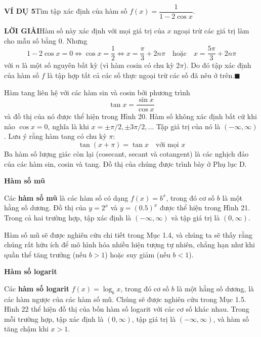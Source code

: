 \begin{minipage}[t]{0.708\textwidth}
    \fontsize{8.8pt}{11.5pt}\selectfont
    \noindent\textbf{\textsf{\color{stewartcyan}VÍ DỤ 5}}\quad Tìm tập xác định của hàm số $f(x) = \dfrac{1}{1 - 2 \cos x}$.

    \vspace{0.2em}
    \noindent\textbf{\textsf{\color{stewartcyan}LỜI GIẢI}}\quad Hàm số này xác định với mọi giá trị của $x$ ngoại trừ các giá trị làm cho mẫu số bằng $0$. Nhưng
    \[
    1 - 2 \cos x = 0 \iff \cos x = \frac{1}{2} \iff x = \frac{\pi}{3} + 2n\pi \quad \text{hoặc} \quad x = \frac{5\pi}{3} + 2n\pi
    \]
    với $n$ là một số nguyên bất kỳ (vì hàm cosin có chu kỳ $2\pi$). Do đó tập xác định của hàm số $f$ là tập hợp tất cả các số thực ngoại trừ các số đã nêu ở trên.\hfill{\color{stewartcyan}$\blacksquare$}

    \vspace{0.4em}
    Hàm tang liên hệ với các hàm sin và cosin bởi phương trình
    \[
    \tan x = \frac{\sin x}{\cos x}
    \]
    và đồ thị của nó được thể hiện trong Hình 20. Hàm số không xác định bất cứ khi nào $\cos x = 0$, nghĩa là khi $x = \pm\pi/2, \pm3\pi/2, \dots$ Tập giá trị của nó là $(-\infty, \infty)$. Lưu ý rằng hàm tang có chu kỳ $\pi$:
    \[
    \tan(x + \pi) = \tan x \quad \text{với mọi } x
    \]
    Ba hàm số lượng giác còn lại (cosecant, secant và cotangent) là các nghịch đảo của các hàm sin, cosin và tang. Đồ thị của chúng được trình bày ở Phụ lục D.

    \vspace{0.6em}
    \noindent{\color{stewartcyan}\rule{6pt}{6pt}}\;\textbf{\textsf{Hàm số mũ}}
    
    \vspace{0.2em}
    \noindent Các \textbf{hàm số mũ} là các hàm số có dạng $f(x) = b^x$, trong đó cơ số $b$ là một hằng số dương. Đồ thị của $y = 2^x$ và $y = (0.5)^x$ được thể hiện trong Hình 21. Trong cả hai trường hợp, tập xác định là $(-\infty, \infty)$ và tập giá trị là $(0, \infty)$.

    Hàm số mũ sẽ được nghiên cứu chi tiết trong Mục 1.4, và chúng ta sẽ thấy rằng chúng rất hữu ích để mô hình hóa nhiều hiện tượng tự nhiên, chẳng hạn như khi quần thể tăng trưởng (nếu $b > 1$) hoặc suy giảm (nếu $b < 1$).

    \vspace{0.6em}
    \noindent{\color{stewartcyan}\rule{6pt}{6pt}}\;\textbf{\textsf{Hàm số logarit}}
    
    \vspace{0.2em}
    \noindent Các \textbf{hàm số logarit} $f(x) = \log_b x$, trong đó cơ số $b$ là một hằng số dương, là các hàm ngược của các hàm số mũ. Chúng sẽ được nghiên cứu trong Mục 1.5. Hình 22 thể hiện đồ thị của bốn hàm số logarit với các cơ số khác nhau. Trong mỗi trường hợp, tập xác định là $(0, \infty)$, tập giá trị là $(-\infty, \infty)$, và hàm số tăng chậm khi $x > 1$.


\end{minipage}
